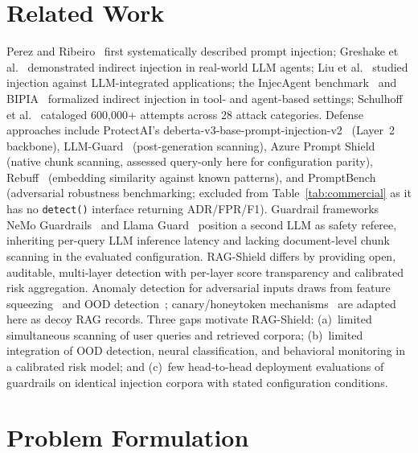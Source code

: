 ﻿\documentclass[conference]{IEEEtran}
\begin{document}
\section{Related Work}

Perez and Ribeiro~\cite{perez2022} first systematically described prompt
injection; Greshake et al.~\cite{greshake2023} demonstrated indirect
injection in real-world LLM agents; Liu et al.~\cite{liu2023} studied
injection against LLM-integrated applications; the InjecAgent
benchmark~\cite{zhan2024} and BIPIA~\cite{yi2023} formalized indirect
injection in tool- and agent-based settings; Schulhoff et
al.~\cite{schulhoff2023} cataloged 600,000+ attempts across 28 attack
categories.
Defense approaches include ProtectAI's
deberta-v3-base-prompt-injection-v2~\cite{protectai2023} (Layer~2 backbone),
LLM-Guard~\cite{llmguard2023} (post-generation scanning), Azure Prompt
Shield~\cite{azurepromptshield2024} (native chunk scanning, assessed
query-only here for configuration parity), Rebuff~\cite{rebuff2023}
(embedding similarity against known patterns), and
PromptBench~\cite{promptbench2023} (adversarial robustness benchmarking;
excluded from Table~\ref{tab:commercial} as it has no \texttt{detect()}
interface returning ADR/FPR/F1).
Guardrail frameworks NeMo Guardrails~\cite{rebedea2023} and Llama
Guard~\cite{inan2023} position a second LLM as safety referee, inheriting
per-query LLM inference latency and lacking document-level chunk scanning in
the evaluated configuration.
RAG-Shield differs by providing open, auditable, multi-layer detection with
per-layer score transparency and calibrated risk aggregation.
Anomaly detection for adversarial inputs draws from feature
squeezing~\cite{xu2018} and OOD detection~\cite{hendrycks2017};
canary/honeytoken mechanisms~\cite{spitzner2003,bowen2009} are adapted here
as decoy RAG records.
Three gaps motivate RAG-Shield: (a)~limited simultaneous scanning of user
queries and retrieved corpora; (b)~limited integration of OOD detection,
neural classification, and behavioral monitoring in a calibrated risk model;
and (c)~few head-to-head deployment evaluations of guardrails on identical
injection corpora with stated configuration conditions.

\section{Problem Formulation}
\end{document}
